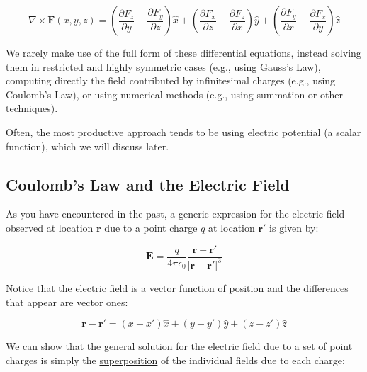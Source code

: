 \[\nabla \times \mathbf{F}(x,y,z) = \left( \frac{\partial F_z}{\partial y} - \frac{\partial F_y}{\partial z} \right) \hat{x} + \left( \frac{\partial F_x}{\partial z} - \frac{\partial F_z}{\partial x} \right) \hat{y} + \left( \frac{\partial F_y}{\partial x} - \frac{\partial F_x}{\partial y} \right) \hat{z}\]

We rarely make use of the full form of these differential equations,
instead solving them in restricted and highly symmetric cases (e.g.,
using Gauss's Law), computing directly the field contributed by
infinitesimal charges (e.g., using Coulomb's Law), or using numerical
methods (e.g., using summation or other techniques).

Often, the most productive approach tends to be using electric potential
(a scalar function), which we will discuss later.

\begin{Shaded}
\begin{Highlighting}[]
\end{Highlighting}
\end{Shaded}

\subsection{Coulomb's Law and the Electric
Field}\label{coulombs-law-and-the-electric-field}

As you have encountered in the past, a generic expression for the
electric field observed at location \(\mathbf{r}\) due to a point charge
\(q\) at location \(\mathbf{r}'\) is given by:

\[\mathbf{E} = \dfrac{q}{4\pi\epsilon_0} \dfrac{\mathbf{r} - \mathbf{r}'}{\left|\mathbf{r} - \mathbf{r}'\right|^3}\]

Notice that the electric field is a vector function of position and the
differences that appear are vector ones:

\[\mathbf{r} - \mathbf{r}' = (x-x')\hat{x} + (y-y')\hat{y} + (z-z')\hat{z}\]

We can show that the general solution for the electric field due to a
set of point charges is simply the
\href{https://en.wikipedia.org/wiki/Superposition_principle}{superposition}
of the individual fields due to each charge:

